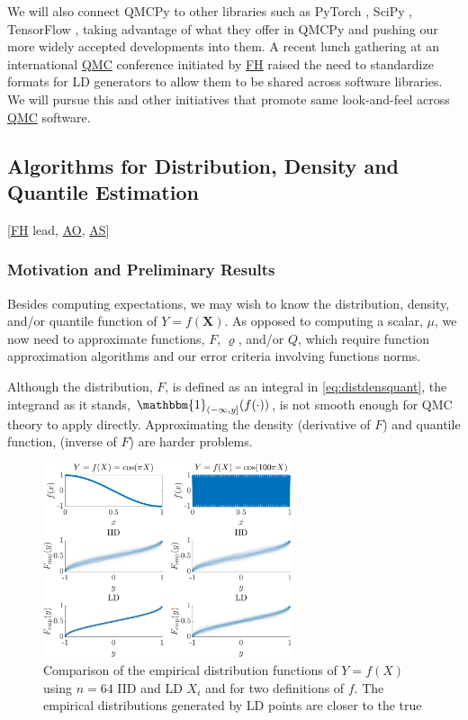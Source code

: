 \documentclass[11pt]{NSFamsart}
\newcommand{\FH}{\hyperlink{FHlink}{FH}\xspace}
\newcommand{\AO}{\hyperlink{AOlink}{AO}\xspace}
\newcommand{\AS}{\hyperlink{ASlink}{AS}\xspace}
\newcommand{\QMC}{\hyperlink{QMClink}{QMC}\xspace}
\newcommand{\QMCPy}{QMCPy\xspace}
\newcommand{\bbone}{\mathbbm{1}}
\newcommand{\bX}{{\boldsymbol{X}}}
\begin{document}
We will also connect QMCPy to other libraries such as PyTorch \cite{paszke2019pytorch}, SciPy \cite{virtanen2020scipy}, TensorFlow \cite{tfqf2021a}, taking advantage of what they offer in \QMCPy and pushing our more widely accepted developments into them.  A recent lunch gathering at an international \QMC conference initiated by \FH raised the need to standardize formats for LD generators to allow them to be shared across software libraries.  We will pursue this and other initiatives that promote same look-and-feel across \QMC software.



\subsection{Algorithms for Distribution, Density  and Quantile  Estimation} \label{sec:distdensquant}  [\FH lead, \AO, \AS{}]


\subsubsection{Motivation and Preliminary Results}
Besides computing expectations, we may wish to know the distribution, density, and/or quantile function of $Y = f(\bX)$.  As opposed to computing a scalar, $\mu$, we now need to approximate functions, $F$, $\varrho$, and/or $Q$, which require function approximation algorithms and our error criteria involving functions norms.

Although the distribution, $F$, is defined as an integral in \cref{eq:distdensquant}, the integrand as it stands, $\bbone_{(-\infty,y]}(f(\cdot))$, is not smooth enough for  QMC theory to apply directly.  Approximating the density (derivative of $F$) and quantile function, (inverse of $F$) are harder problems.

\begin{figure}
	\centering
	\includegraphics[width = 0.65\textwidth]{ProgramsImages/distribExperEG.pdf}
	\caption{Comparison of the empirical distribution functions of $Y = f(X)$ using $n=64$ IID and LD $X_i$ and for two definitions of $f$. The empirical distributions generated by LD points are closer to the true} \label{fig:empdistcomp}
\end{figure}
\end{document}
